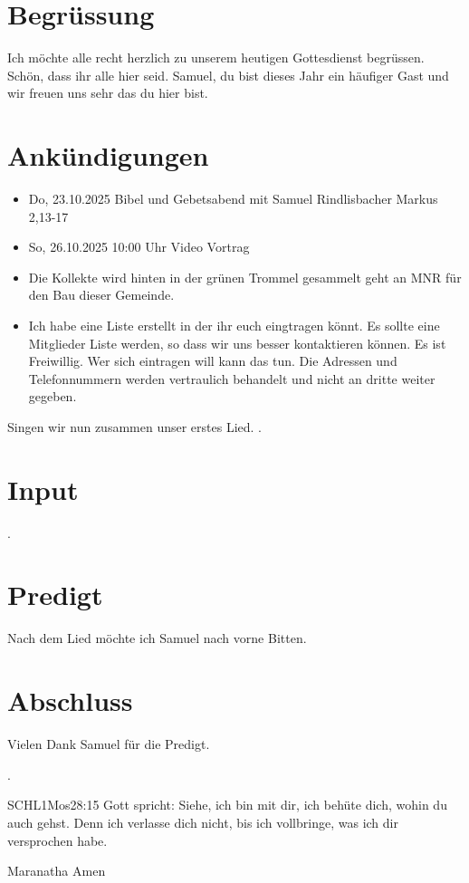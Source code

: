 \documentclass{mybib}
\begin{document}
\section{Begrüssung}
Ich möchte alle recht herzlich zu unserem heutigen Gottesdienst begrüssen. Schön, dass ihr alle hier seid. Samuel, du bist dieses Jahr ein häufiger Gast und wir freuen uns sehr das du hier bist.

\beten{}

\section{Ankündigungen}
\begin{itemize}
    \item {} Do,  23.10.2025 Bibel und Gebetsabend mit Samuel Rindlisbacher Markus 2,13-17
    \item {} So, 26.10.2025 10:00 Uhr Video Vortrag    
    \item Die Kollekte wird hinten in der grünen Trommel gesammelt geht an MNR für den Bau dieser Gemeinde.    
    \item Ich habe eine Liste erstellt in der ihr euch eingtragen könnt. Es sollte eine Mitglieder Liste werden, so dass wir uns besser kontaktieren können. Es ist Freiwillig. Wer sich eintragen will kann das tun. Die Adressen und Telefonnummern werden vertraulich behandelt und nicht an dritte weiter gegeben.
\end{itemize}

Singen wir nun zusammen unser erstes Lied.
{}.


\section{ Input }
   
.

\section{Predigt}
Nach dem Lied möchte ich Samuel nach vorne Bitten.

\section{Abschluss}
Vielen Dank Samuel für die Predigt.

.

\beten{}

\begin{bibelbox}{SCHL}{1Mos}{28:15}
    Gott spricht: Siehe, ich bin mit dir,
    ich behüte dich, wohin du auch gehst.
    Denn ich verlasse dich nicht,
    bis ich vollbringe, was ich dir versprochen habe.
\end{bibelbox}

Maranatha Amen
\end{document}
